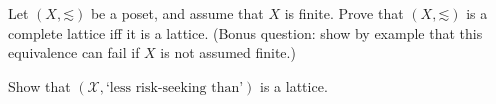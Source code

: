 \begin{exercise}
	\label{exercise:latt_compl_finite}
	Let $(X,\mathord{\lesssim})$ be a poset, and assume that $X$ is finite. Prove that $(X,\mathord{\lesssim})$ is a complete lattice iff it is a lattice. (Bonus question: show by example that this equivalence can fail if $X$ is not assumed finite.)
\end{exercise}

\begin{namedthm}
	\label{exercise:arrow-pratt_lattice}
	Show that $\left(\mathcal{X},\text{`less risk-seeking than'}\right)$ is a lattice.
\end{namedthm}


